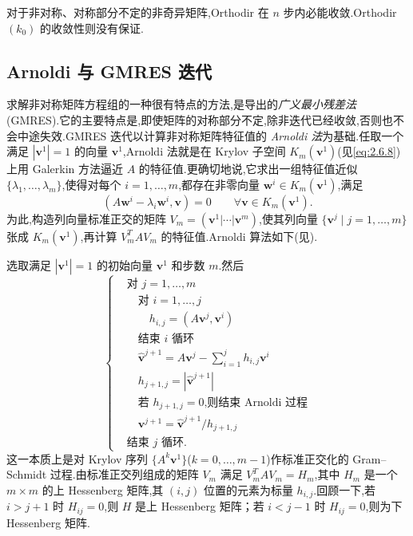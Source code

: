 对于非对称、对称部分不定的非奇异矩阵,Orthodir 在 \(n\) 步内必能收敛.Orthodir\((k_0)\) 的收敛性则没有保证.

\subsection{Arnoldi 与 GMRES 迭代}\label{sec:2.6.2}

求解非对称矩阵方程组的一种很有特点的方法,是导出的\emph{广义最小残差法}(GMRES).它的主要特点是,即使矩阵的对称部分不定,除非迭代已经收敛,否则也不会中途失效.GMRES 迭代以计算非对称矩阵特征值的 \emph{Arnoldi 法}为基础.任取一个满足 \(|\boldsymbol{v}^1|=1\) 的向量 \(\boldsymbol{v}^1\),Arnoldi 法就是在 Krylov 子空间 \(K_m(\boldsymbol{v}^1)\)(见\eqref{eq:2.6.8})上用 Galerkin 方法逼近 \(A\) 的特征值.更确切地说,它求出一组特征值近似 \(\{\lambda_1,\ldots,\lambda_m\}\),使得对每个 \(i=1,\ldots,m\),都存在非零向量 \(\boldsymbol{w}^i\in K_m(\boldsymbol{v}^1)\),满足
\[
  (A\boldsymbol{w}^i-\lambda_i\boldsymbol{w}^i,\boldsymbol{v})=0
  \qquad \forall\boldsymbol{v}\in K_m(\boldsymbol{v}^1).
\]
为此,构造列向量标准正交的矩阵 \(V_m=(\boldsymbol{v}^1|\cdots|\boldsymbol{v}^m)\),使其列向量 \(\{\boldsymbol{v}^j\mid j=1,\ldots,m\}\) 张成 \(K_m(\boldsymbol{v}^1)\),再计算 \(V_m^TAV_m\) 的特征值.Arnoldi 算法如下(见).

选取满足 \(|\boldsymbol{v}^1|=1\) 的初始向量 \(\boldsymbol{v}^1\) 和步数 \(m\).然后
\begin{equation}\label{eq:2.6.19}
  \left\{
  \begin{aligned}
    &\text{对 }j=1,\ldots,m\\
    &\quad\text{对 }i=1,\ldots,j\\
    &\qquad h_{i,j}=(A\boldsymbol{v}^j,\boldsymbol{v}^i)\\
    &\quad\text{结束 \(i\) 循环}\\
    &\quad\widehat{\boldsymbol{v}}^{j+1}=A\boldsymbol{v}^j-\sum_{i=1}^j h_{i,j}\boldsymbol{v}^i\\
    &\quad h_{j+1,j}=|\widehat{\boldsymbol{v}}^{j+1}|\\
    &\quad\text{若 \(h_{j+1,j}=0\),则结束 Arnoldi 过程}\\
    &\quad\boldsymbol{v}^{j+1}=\widehat{\boldsymbol{v}}^{j+1}/h_{j+1,j}\\
    &\text{结束 \(j\) 循环.}
  \end{aligned}
  \right.
\end{equation}
这一本质上是对 Krylov 序列 \(\{A^k\boldsymbol{v}^1\}\)(\(k=0,\ldots,m-1\))作标准正交化的 Gram--Schmidt 过程.由标准正交列组成的矩阵 \(V_m\) 满足 \(V_m^TAV_m=H_m\),其中 \(H_m\) 是一个 \(m\times m\) 的上 Hessenberg 矩阵,其 \((i,j)\) 位置的元素为标量 \(h_{i,j}\).回顾一下,若 \(i>j+1\) 时 \(H_{ij}=0\),则 \(H\) 是上 Hessenberg 矩阵；若 \(i<j-1\) 时 \(H_{ij}=0\),则为下 Hessenberg 矩阵.

